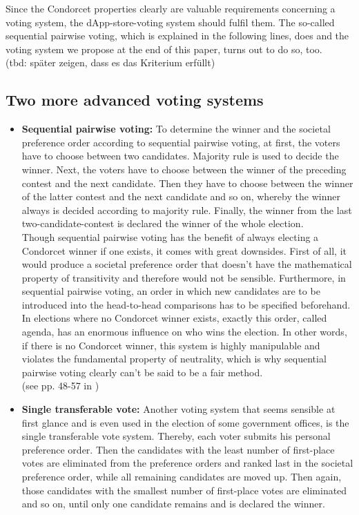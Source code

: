 \noindent Since the Condorcet properties clearly are valuable requirements concerning a voting system, the dApp-store-voting system should fulfil them. The so-called sequential pairwise voting, which is explained in the following lines, does and the voting system we propose at the end of this paper, turns out to do so, too.\\ (tbd: später zeigen, dass es das Kriterium erfüllt)\\

\subsection{Two more advanced voting systems}
\begin{itemize}[leftmargin = 0pt, nosep] 
\item \textbf{Sequential pairwise voting:} 
To determine the winner and the societal preference order according to sequential pairwise voting, at first, the voters have to choose between two candidates. Majority rule is used to decide the winner. Next, the voters have to choose between the winner of the preceding contest and the next candidate. Then they have to choose between the winner of the latter contest and the next candidate and so on, whereby the winner always is decided according to majority rule. Finally, the winner from the last two-candidate-contest is declared the winner of the whole election. \\
Though sequential pairwise voting has the benefit of always electing a Condorcet winner if one exists, it comes with great downsides. First of all, it would produce a societal preference order that doesn't have the mathematical property of transitivity and therefore would not be sensible. Furthermore, in sequential pairwise voting, an order in which new candidates are to be introduced into the head-to-head comparisons has to be specified beforehand. In elections where no Condorcet winner exists, exactly this order, called agenda, has an enormous influence on who wins the election. In other words, if there is no Condorcet winner, this system is highly manipulable and violates the fundamental property of neutrality, which is why sequential pairwise voting clearly can't be said to be a fair method. \\
(see pp. 48-57 in \cite{voting})
\item \textbf{Single transferable vote:} 
Another voting system that seems sensible at first glance and is even used in the election of some government offices, is the single transferable vote system. Thereby, each voter submits his personal preference order. Then the candidates with the least number of first-place votes are eliminated from the preference orders and ranked last in the societal preference order, while all remaining candidates are moved up. Then again, those candidates with the smallest number of first-place votes are eliminated and so on, until only one candidate remains and is declared the winner. \\

\end{itemize}
